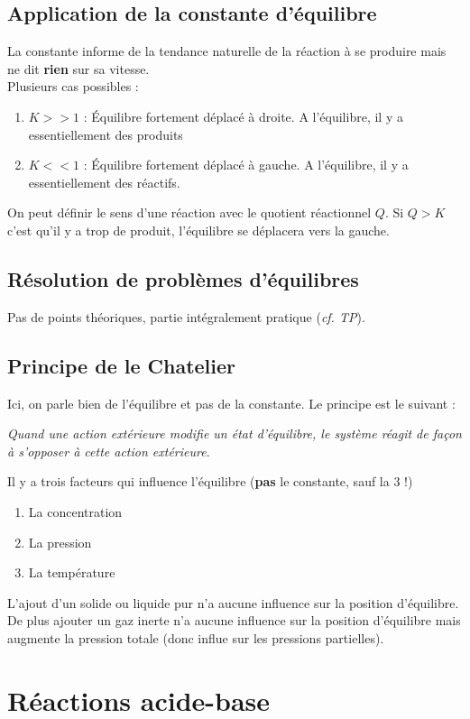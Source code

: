 \documentclass[british,french,11pt, a4paper, openany]{book}
\begin{document}
\section{Application de la constante d'équilibre}
La constante informe de la tendance naturelle de la réaction à se produire mais ne dit \textbf{rien} sur sa vitesse.\\
Plusieurs cas possibles :
\begin{enumerate}
	\item $K >> 1$ : Équilibre fortement déplacé à droite. A l'équilibre, il y a essentiellement des produits
	\item $K << 1$ : Équilibre fortement déplacé à gauche. A l'équilibre, il y a essentiellement des réactifs.
\end{enumerate}
On peut définir le sens d'une réaction avec le quotient réactionnel $Q$. Si $Q > K$ c'est qu'il y a trop de produit, l'équilibre se déplacera vers la gauche.

\section{Résolution de problèmes d'équilibres}
Pas de points théoriques, partie intégralement pratique (\textit{cf. TP}).

\section{Principe de le Chatelier}
Ici, on parle bien de l'équilibre et pas de la constante. Le principe est le suivant : 
\begin{center}
	\textit{Quand une action extérieure modifie un état d'équilibre, le système réagit de façon à s'opposer à cette action extérieure}.
\end{center}
Il y a trois facteurs qui influence l'équilibre (\textbf{pas} le constante, sauf la 3 !)
\begin{enumerate}
	\item La concentration
	\item La pression
	\item La température
\end{enumerate}
L'ajout d'un solide ou liquide pur n'a aucune influence sur la position d'équilibre. De plus ajouter un gaz inerte n'a aucune influence sur la position d'équilibre mais augmente la pression totale (donc influe sur les pressions partielles).

\newpage
\chapter{Réactions acide-base}
\end{document}
